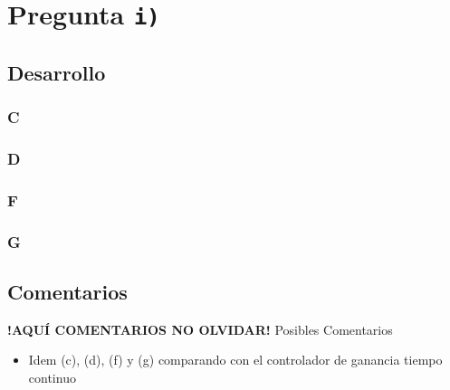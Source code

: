 \section{Pregunta \texttt{i)}}\label{pregunta-i}
\subsection{Desarrollo}


\subsubsection{C} %

\FloatBarrier
\subsubsection{D}%


\FloatBarrier
\subsubsection{F}%

\FloatBarrier
\subsubsection{G}%


\FloatBarrier
\subsection{Comentarios}


\textbf{!AQUÍ COMENTARIOS NO OLVIDAR!}
Posibles Comentarios
\begin{itemize}
    \item Idem (c), (d), (f) y (g) comparando con el controlador de ganancia tiempo continuo
\end{itemize}